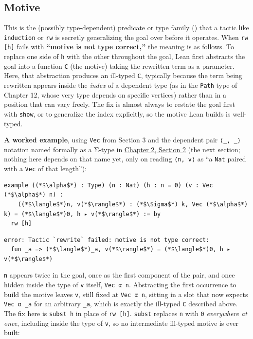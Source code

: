 \subsection{Motive}\label{sec:02-terminology-and-coc:01-terminology:5}

This is the (possibly type-dependent) predicate or type family (\cite{TPIL4}) that a tactic like \texttt{induction} or \texttt{rw} is secretly generalizing the goal over before it operates. When \texttt{rw [h]} fails with \textbf{``motive is not type correct,''} the meaning is as follows. To replace one side of \texttt{h} with the other throughout the goal, Lean first abstracts the goal into a function \texttt{C} (the motive) taking the rewritten term as a parameter. Here, that abstraction produces an ill-typed \texttt{C}, typically because the term being rewritten appears inside the \emph{index} of a dependent type (as in the \texttt{Path} type of Chapter 12, whose very type depends on specific vertices) rather than in a position that can vary freely. The fix is almost always to restate the goal first with \texttt{show}, or to generalize the index explicitly, so the motive Lean builds is well-typed.

\textbf{A worked example}, using \texttt{Vec} from Section 3 and the dependent pair \texttt{⟨\_\allowbreak{}, \_\allowbreak{}⟩} notation named formally as a Σ-type in \hyperref[sec:02-terminology-and-coc:02-pi-sigma-and-coc:1]{Chapter 2, Section 2} (the next section; nothing here depends on that name yet, only on reading \texttt{⟨n, v⟩} as ``a \texttt{Nat} paired with a \texttt{Vec} of that length''):

\begin{lstlisting}
example ((*$\alpha$*) : Type) (n : Nat) (h : n = 0) (v : Vec (*$\alpha$*) n) :
    ((*$\langle$*)n, v(*$\rangle$*) : (*$\Sigma$*) k, Vec (*$\alpha$*) k) = (*$\langle$*)0, h ▸ v(*$\rangle$*) := by
  rw [h]
\end{lstlisting}

\begin{lstlisting}
error: Tactic `rewrite` failed: motive is not type correct:
  fun _a => (*$\langle$*)_a, v(*$\rangle$*) = (*$\langle$*)0, h ▸ v(*$\rangle$*)
\end{lstlisting}

\texttt{n} appears twice in the goal, once as the first component of the pair, and once hidden inside the type of \texttt{v} itself, \texttt{Vec α n}. Abstracting the first occurrence to build the motive leaves \texttt{v}, still fixed at \texttt{Vec α n}, sitting in a slot that now expects \texttt{Vec α \_\allowbreak{}a} for an arbitrary \texttt{\_\allowbreak{}a}, which is exactly the ill-typed \texttt{C} described above. The fix here is \texttt{subst h} in place of \texttt{rw [h]}. \texttt{subst} replaces \texttt{n} with \texttt{0} \emph{everywhere at once}, including inside the type of \texttt{v}, so no intermediate ill-typed motive is ever built:


